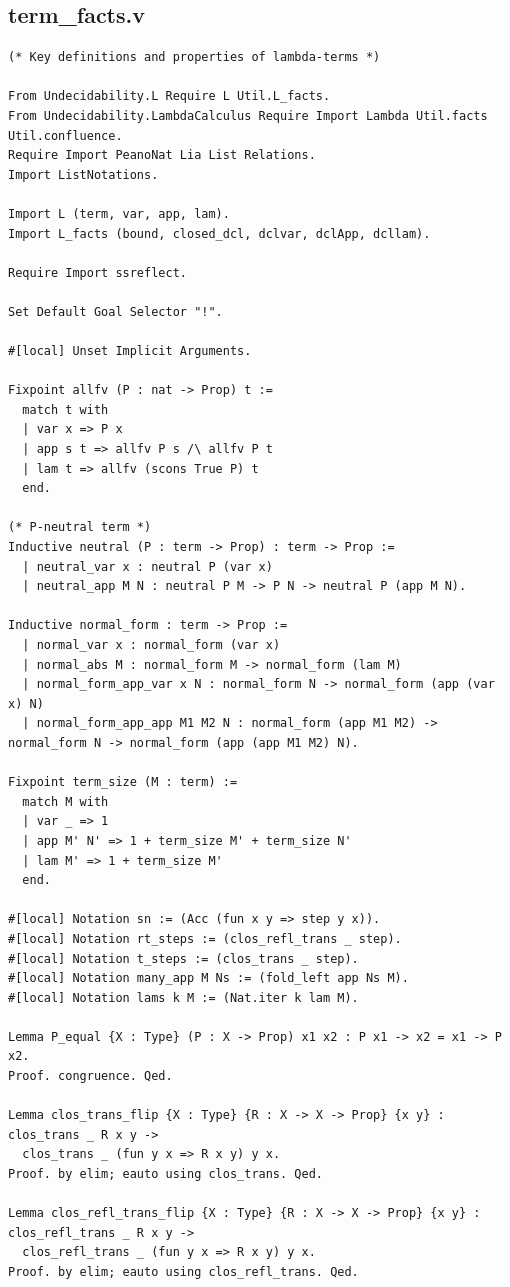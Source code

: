 \documentclass[10pt,a4paper]{amsart}
\begin{document}
\subsection*{term\_facts.v}
\begin{lstlisting}
(* Key definitions and properties of lambda-terms *)

From Undecidability.L Require L Util.L_facts.
From Undecidability.LambdaCalculus Require Import Lambda Util.facts Util.confluence.
Require Import PeanoNat Lia List Relations.
Import ListNotations.

Import L (term, var, app, lam).
Import L_facts (bound, closed_dcl, dclvar, dclApp, dcllam).

Require Import ssreflect.

Set Default Goal Selector "!".

#[local] Unset Implicit Arguments.

Fixpoint allfv (P : nat -> Prop) t := 
  match t with
  | var x => P x
  | app s t => allfv P s /\ allfv P t
  | lam t => allfv (scons True P) t
  end.

(* P-neutral term *)
Inductive neutral (P : term -> Prop) : term -> Prop :=
  | neutral_var x : neutral P (var x)
  | neutral_app M N : neutral P M -> P N -> neutral P (app M N).

Inductive normal_form : term -> Prop :=
  | normal_var x : normal_form (var x)
  | normal_abs M : normal_form M -> normal_form (lam M)
  | normal_form_app_var x N : normal_form N -> normal_form (app (var x) N)
  | normal_form_app_app M1 M2 N : normal_form (app M1 M2) -> normal_form N -> normal_form (app (app M1 M2) N).

Fixpoint term_size (M : term) :=
  match M with
  | var _ => 1
  | app M' N' => 1 + term_size M' + term_size N'
  | lam M' => 1 + term_size M'
  end.

#[local] Notation sn := (Acc (fun x y => step y x)).
#[local] Notation rt_steps := (clos_refl_trans _ step).
#[local] Notation t_steps := (clos_trans _ step).
#[local] Notation many_app M Ns := (fold_left app Ns M).
#[local] Notation lams k M := (Nat.iter k lam M).

Lemma P_equal {X : Type} (P : X -> Prop) x1 x2 : P x1 -> x2 = x1 -> P x2.
Proof. congruence. Qed.

Lemma clos_trans_flip {X : Type} {R : X -> X -> Prop} {x y} : clos_trans _ R x y ->
  clos_trans _ (fun y x => R x y) y x.
Proof. by elim; eauto using clos_trans. Qed.

Lemma clos_refl_trans_flip {X : Type} {R : X -> X -> Prop} {x y} : clos_refl_trans _ R x y ->
  clos_refl_trans _ (fun y x => R x y) y x.
Proof. by elim; eauto using clos_refl_trans. Qed.


\end{lstlisting}
\end{document}
